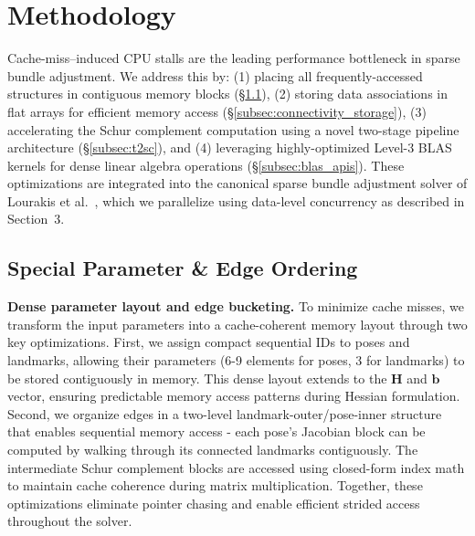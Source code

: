 \section{Methodology}
\label{sec:methodology}

Cache-miss--induced CPU stalls are the leading performance bottleneck in sparse bundle adjustment.
We address this by: (1) placing all frequently-accessed structures in contiguous memory blocks
(\S\ref{subsec:parameter_ordering}), (2) storing data associations
in flat arrays for efficient memory access (\S\ref{subsec:connectivity_storage}), (3)
accelerating the Schur complement computation using a novel two-stage
pipeline architecture (\S\ref{subsec:t2sc}), and (4) leveraging highly-optimized Level-3 BLAS kernels for
dense linear algebra operations (\S\ref{subsec:blas_apis}). These optimizations are integrated into the
canonical sparse bundle adjustment solver of Lourakis et al.~\cite{lourakis2004design,lourakis2009sba}, which
we parallelize using data-level concurrency as described in Section~3.


\subsection{Special Parameter \& Edge Ordering}
\label{subsec:parameter_ordering}

\textbf{Dense parameter layout and edge bucketing.} To minimize cache misses, we transform the input parameters into
a cache-coherent memory layout through two key optimizations. First, we assign compact sequential IDs to poses and landmarks, 
allowing their parameters (6-9 elements for poses, 3 for landmarks) to be stored contiguously in memory. This dense layout 
extends to the $\mathbf{H}$ and $\mathbf{b}$ vector, ensuring predictable memory access patterns during Hessian formulation. Second, we organize edges in a two-level landmark-outer/pose-inner structure that enables 
sequential memory access - each pose's Jacobian block can be computed by walking through its connected landmarks contiguously. 
The intermediate Schur complement blocks are accessed using closed-form index math to maintain cache coherence during matrix 
multiplication. Together, these optimizations eliminate pointer chasing and enable efficient strided access throughout the solver.

